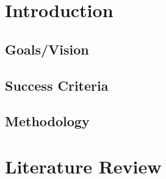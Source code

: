 \documentclass [11pt, proquest] {uwthesis}[2020/02/24]
\begin{document}
\tableofcontents
\listoffigures

\textpages


\chapter{Introduction}

\section{Goals/Vision}


\section{Success Criteria}


\section{Methodology}


\chapter{Literature Review}


%
\nocite{*}   %


\end{document}
